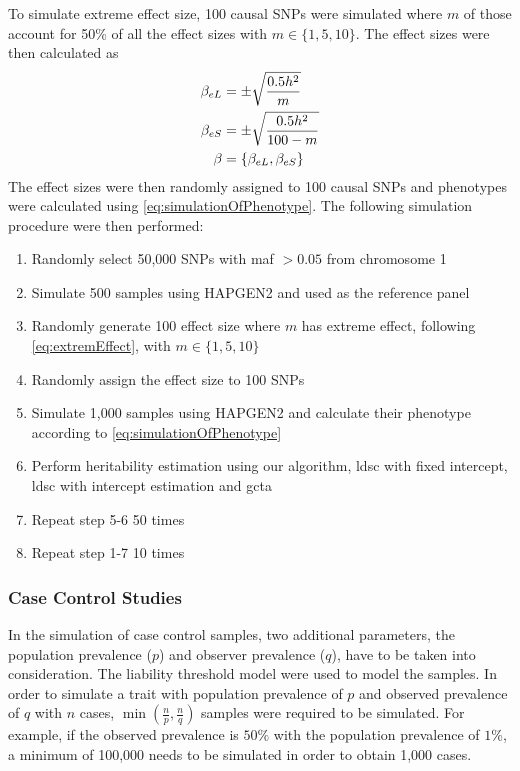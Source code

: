 		To simulate extreme effect size, 100 causal \glspl{SNP} were simulated where $m$ of those account for 50\% of all the effect sizes with $m\in\{1,5,10\}$.
		The effect sizes were then calculated as
		\begin{align}
		\beta_{eL} &= \pm\sqrt{\frac{0.5h^2}{m}} \notag\\
		\beta_{eS} &= \pm\sqrt{\frac{0.5h^2}{100-m}} \notag\\
		\beta &= \{\beta_{eL}, \beta_{eS}\}
		\label{eq:extremEffect}
		\end{align}
		The effect sizes were then randomly assigned to 100 causal \glspl{SNP} and phenotypes were calculated using \cref{eq:simulationOfPhenotype}.
		The following simulation procedure were then performed:
		\begin{enumerate}
			\item Randomly select 50,000 \glspl{SNP} with \gls{maf} $>0.05$ from chromosome 1
			\item Simulate 500 samples using HAPGEN2 and used as the reference panel
			\item Randomly generate 100 effect size where $m$ has extreme effect, following \cref{eq:extremEffect}, with $m\in\{1,5,10\}$
			\item Randomly assign the effect size to 100 \glspl{SNP}
			\item Simulate 1,000 samples using HAPGEN2 and calculate their phenotype according to \cref{eq:simulationOfPhenotype}
			\item Perform heritability estimation using our algorithm, \gls{ldsc} with fixed intercept, \gls{ldsc} with intercept estimation and \gls{gcta}
			\item Repeat step 5-6 50 times
			\item Repeat step 1-7 10 times
		\end{enumerate}
		
		\subsubsection{Case Control Studies}
		In the simulation of case control samples, two additional parameters, the population prevalence ($p$) and observer prevalence ($q$), have to be taken into consideration. 
		The liability threshold model were used to model the samples.
		In order to simulate a trait with population prevalence of $p$ and observed prevalence of $q$ with $n$ cases, $\min(\frac{n}{p}, \frac{n}{q})$ samples were required to be simulated. 
		For example, if the observed prevalence is $50\%$ with the population prevalence of $1\%$, a minimum of 100,000 needs to be simulated in order to obtain 1,000 cases.
		
